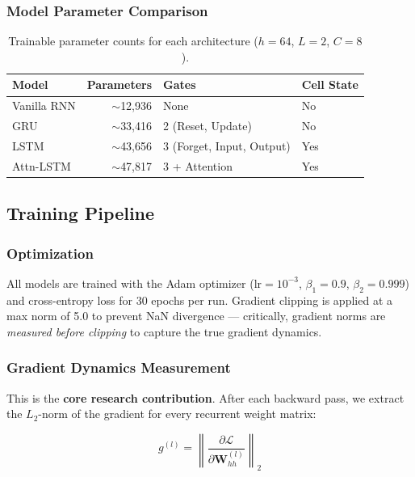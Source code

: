 \documentclass[12pt, a4paper]{article}
\begin{document}
\subsubsection{Model Parameter Comparison}

\begin{table}[H]
    \centering
    \caption{Trainable parameter counts for each architecture ($h=64$, $L=2$, $C=8$).}
    \label{tab:params}
    \begin{tabular}{lrll}
        \toprule
        \textbf{Model} & \textbf{Parameters} & \textbf{Gates} & \textbf{Cell State} \\
        \midrule
        Vanilla RNN & $\sim$12,936 & None & No \\
        GRU & $\sim$33,416 & 2 (Reset, Update) & No \\
        LSTM & $\sim$43,656 & 3 (Forget, Input, Output) & Yes \\
        Attn-LSTM & $\sim$47,817 & 3 + Attention & Yes \\
        \bottomrule
    \end{tabular}
\end{table}

\subsection{Training Pipeline}

\subsubsection{Optimization}

All models are trained with the Adam optimizer \cite{kingma2015} ($\text{lr} = 10^{-3}$, $\beta_1 = 0.9$, $\beta_2 = 0.999$) and cross-entropy loss for 30 epochs per run. Gradient clipping is applied at a max norm of 5.0 to prevent NaN divergence — critically, gradient norms are \textit{measured before clipping} to capture the true gradient dynamics.

\subsubsection{Gradient Dynamics Measurement}

This is the \textbf{core research contribution}. After each backward pass, we extract the $L_2$-norm of the gradient for every recurrent weight matrix:

\begin{equation}
    g^{(l)} = \left\| \frac{\partial \mathcal{L}}{\partial \mathbf{W}_{hh}^{(l)}} \right\|_2
    \label{eq:grad_norm}
\end{equation}
\end{document}
